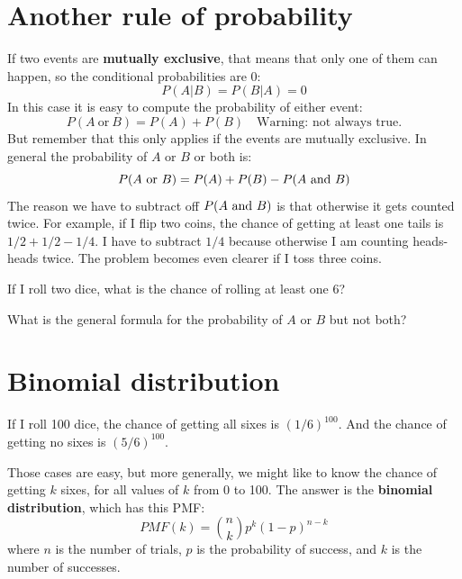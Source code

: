 \documentclass[12pt]{book}
\begin{document}
\section{Another rule of probability}

\newcommand{\OR}{~\mbox{or}~}
\newcommand{\NOT}{~\mbox{not}~}

If two events are {\bf mutually exclusive}, that means that only
one of them can happen, so the conditional probabilities are 0:
%
\[ P(A|B) = P(B|A) = 0 \]
%
In this case it is easy to compute the probability of either event:
%
\[ P(A \OR B) = P(A) + P(B)   \quad \mbox{Warning: not always true.} \]
%
But remember that this only applies if the events are mutually
exclusive.  In general the probability of $A$ or $B$ or both is:
%
\[ P(A \OR B) = P(A) + P(B) - P(A \AND B) \]
%
The reason we have to subtract off $P(A ~\mbox{and}~ B)$ is that otherwise it
gets counted twice.  For example, if I flip two coins, the chance of
getting at least one tails is $1/2 + 1/2 - 1/4$.  I have to subtract
$1/4$ because otherwise I am counting heads-heads twice.  The problem
becomes even clearer if I toss three coins.

\begin{ex}
If I roll two dice, what is the chance of rolling at least one 6?


\end{ex}

\begin{ex}
What is the general formula for the probability of $A$ or $B$ but not both?


\end{ex}


\section{Binomial distribution}

If I roll 100 dice, the chance of getting all sixes is
$(1/6)^{100}$.  And the chance of getting no sixes is $(5/6)^{100}$.

Those cases are easy, but more generally, we might like to know the
chance of getting $k$ sixes, for all values of $k$ from 0 to 100.  The
answer is the {\bf binomial distribution}, which has this PMF:
%
\[ PMF(k) = \binom{n}{k} p^k (1-p)^{n-k}\]
%
where $n$ is the number of trials, $p$ is the probability of success,
and $k$ is the number of successes.
\end{document}
